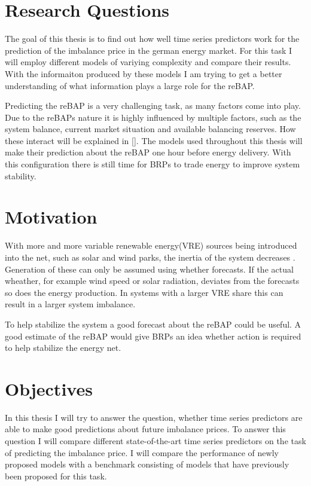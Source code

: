 \documentclass[class=scrbook, crop=false]{standalone}
\begin{document}


\section{Research Questions}
\label{Section::Research_Questions}
The goal of this thesis is to find out how well time series predictors work for the prediction of the imbalance price in the german energy market. 
For this task I will employ different models of variying complexity and compare their results.
With the informaiton produced by these models I am trying to get a better understanding of what information plays a large role for the reBAP.

Predicting the reBAP is a very challenging task, as many factors come into play.
Due to the reBAPs nature it is highly influenced by multiple factors, such as the system balance, current market situation and available balancing reserves. 
How these interact will be explained in \ref{}. 
The models used throughout this thesis will make their prediction about the reBAP one hour before energy delivery. 
With this configuration there is still time for BRPs to trade energy to improve system stability. 


\section{Motivation}
\label{Section::Motivation}

With more and more variable renewable energy(VRE) sources being introduced into the net, such as solar and wind parks, the inertia of the system decreases \cite{weitemeyer2015integration}. 
Generation of these can only be assumed using whether forecasts. If the actual wheather, for example wind speed or solar radiation, deviates from the forecasts so does the energy production. In systems with a larger VRE share this can result in a larger system imbalance. 

To help stabilize the system a good forecast about the reBAP could be useful. A good estimate of the reBAP would give BRPs an idea whether action is required to help stabilize the energy net.

\section{Objectives}
\label{Section::Objectives}
In this thesis I will try to answer the question, whether time series predictors are able to make good predictions about future imbalance prices. To answer this question I will compare different state-of-the-art time series predictors on the task of predicting the imbalance price. I will compare the performance of newly proposed models with a benchmark consisting of models that have previously been proposed for this task.
\end{document}

